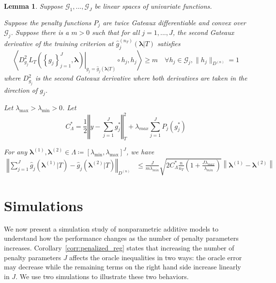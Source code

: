\documentclass[12pt]{article}
\newtheorem{lemma}{Lemma}
\begin{document}
\begin{lemma}
	\label{lemma:nonparam_smooth}
	Suppose $\mathcal{G}_1, ..., \mathcal{G}_J$ be linear spaces of univariate functions.
	
	Suppose the penalty functions $P_{j}$ are twice Gateaux differentiable and convex over $\mathcal{G}_j$. Suppose there is a $m > 0$ such that for all $j=1,...,J$, the second Gateaux derivative of the training criterion at $\hat{g}^{(n_T)}_j( \boldsymbol{\lambda} | T)$ satisfies
	\begin{equation}
	\left \langle 
	\left . D^2_{g_j} L_T \left ( \left \{ g_j \right \}_{j=1}^J, \boldsymbol{\lambda} \right ) \right |_{g_j= \hat{g}_j( \boldsymbol{\lambda} | T) }
	\circ h_j, h_j
	\right \rangle 
	\ge m
	\quad \forall h_j \in \mathcal{G}_j,  \|h_j \|_{D^{(n)}} = 1
	\label{eq:gateuax}
	\end{equation}
	where $D^2_{g_j}$ is the second Gateaux derivative where both derivatives are taken in the direction of $g_j$.
	
	Let $\lambda_{\max} > \lambda_{\min} > 0 $. Let
	\begin{equation}
	C_{\Lambda}^*=
	\frac{1}{2}\left\Vert y- \sum_{j=1}^J g^*_j\right\Vert _{T}^{2}
	+\lambda_{max}\sum_{j=1}^{J} P_{j}(g^*_j)
	\end{equation}
	
	For any $\boldsymbol{\lambda}^{(1)}, \boldsymbol{\lambda}^{(2)} \in \Lambda \coloneqq \left [ \lambda_{\min}, \lambda_{\max} \right ]^J$, we have
	\begin{align}
	\label{eq:nonparam_lipshitz_thrm}
	\left\Vert 
	\sum_{j=1}^J \hat{g}_j\left(\boldsymbol{\lambda}^{(1)} |T \right)-\hat{g}_j\left(\boldsymbol{\lambda}^{(2)} |T \right)\right\Vert _{D^{(n)}} & \le
	\frac{J}{m \lambda_{min}}\sqrt{2 C_{\Lambda}^* \frac{n}{n_{T}}\left(1+\frac{J\lambda_{max}}{\lambda_{min}}\right)}
	\left \|\boldsymbol{\lambda}^{(1)}-\boldsymbol{\lambda}^{(2)} \right \|
	\end{align}
\end{lemma}


\section{Simulations}\label{sec:simulations}

We now present a simulation study of nonparametric additive models to understand how the performance changes as the number of penalty parameters increases. 
Corollary~\ref{corr:penalized_reg} states that increasing the number of penalty parameters $J$ affects the oracle inequalities in two ways: the oracle error may decrease while the remaining terms on the right hand side increase linearly in $J$. We use two simulations to illustrate these two behaviors.
\end{document}
